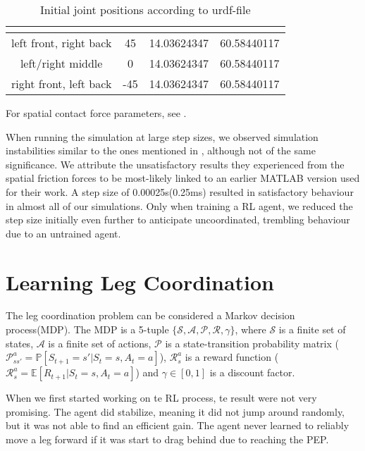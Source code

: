 \begin{table}
	\centering
	\begin{tabular}{| c | c | c | c |} 
		\hline
		 & \textbf{\textalpha} & \textbf{\textbeta} & \textbf{\textgamma} \\ [0.5ex] 
		\hline
		left front, right back & 45 & 14.03624347 & 60.58440117  \\ 
		\hline
		left/right middle & 0 & 14.03624347 & 60.58440117 \\
		\hline
		right front, left back & -45 & 14.03624347 & 60.58440117 \\
		\hline
	\end{tabular}
	\caption{Initial joint positions according to urdf-file}
	\label{table:Initial joint positions}
\end{table}

For spatial contact force parameters, see \parencite{trotta2022walking}.

When running the simulation at large step sizes, we observed simulation instabilities similar to the ones mentioned in \parencite{thilderkvist2015motion}, although not of the same significance.
We attribute the unsatisfactory results they experienced from the spatial friction forces to be most-likely linked to an earlier MATLAB version used for their work.
A step size of 0.00025s(0.25ms) resulted in satisfactory behaviour in almost all of our simulations.
Only when training a RL agent, we reduced the step size initially even further to anticipate uncoordinated, trembling behaviour due to an untrained agent.


\section{Learning Leg Coordination} \label{sec: RL setup}
The leg coordination problem can be considered a Markov decision process(MDP).
The MDP is a 5-tuple $\mathcal{\{S,A,P,R,\gamma\}}$, where $\mathcal{S}$ is a finite set of states, $\mathcal{A}$ is a finite set of actions, $\mathcal{P}$ is a state-transition probability matrix ($\mathcal{P}_{ss'}^a=\mathbb{P}[S_{t+1}=s' | S_t=s, A_t=a]$), $\mathcal{R}_s^a$ is a reward function ($\mathcal{R}_s^a = \mathbb{E}[R_{t+1} | S_t=s, A_t=a]$) and $\gamma \in [0,1]$ is a discount factor.


When we first started working on te RL process, te result were not very promising. The agent did stabilize, meaning it did not jump around randomly, but it was not able to find an efficient gain.
The agent never learned to reliably move a leg forward if it was start to drag behind due to reaching the PEP.


